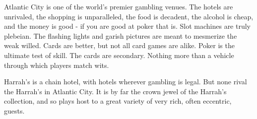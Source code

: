 \documentclass[blue]{AtlanticCity}
\begin{document}
\name{\bSetting{}}

Atlantic City is one of the world's premier gambling venues. The hotels are unrivaled, the shopping is unparalleled, the food is decadent, the alcohol is cheap, and the money is good - if you are good at poker that is. Slot machines are truly plebeian. The flashing lights and garish pictures are meant to mesmerize the weak willed. Cards are better, but not all card games are alike. Poker is the ultimate test of skill. The cards are secondary. Nothing more than a vehicle through which players match wits.

Harrah's is a chain hotel, with hotels wherever gambling is legal. But none rival the Harrah's in Atlantic City. It is by far the crown jewel of the Harrah's collection, and so plays host to a great variety of very rich, often eccentric, guests.
\end{document}
